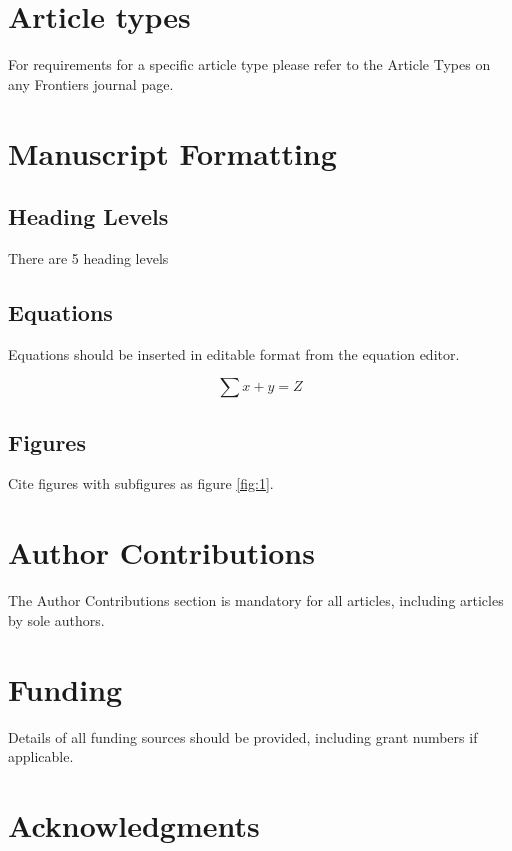 \documentclass[
  utf8]{FrontiersinHarvard}
\begin{document}
\section{Article types}\label{article-types}

For requirements for a specific article type please refer to the Article
Types on any Frontiers journal page.

\section{Manuscript Formatting}\label{manuscript-formatting}

\subsection{Heading Levels}\label{heading-levels}

There are 5 heading levels

\subsection{Equations}\label{equations}

Equations should be inserted in editable format from the equation
editor.

\[
\sum x+ y =Z
\]

\subsection{Figures}\label{figures}

Cite figures with subfigures as figure \ref{fig:1}.

\section{Author Contributions}\label{author-contributions}

The Author Contributions section is mandatory for all articles,
including articles by sole authors.

\section{Funding}\label{funding}

Details of all funding sources should be provided, including grant
numbers if applicable.

\section{Acknowledgments}\label{acknowledgments}
\end{document}
